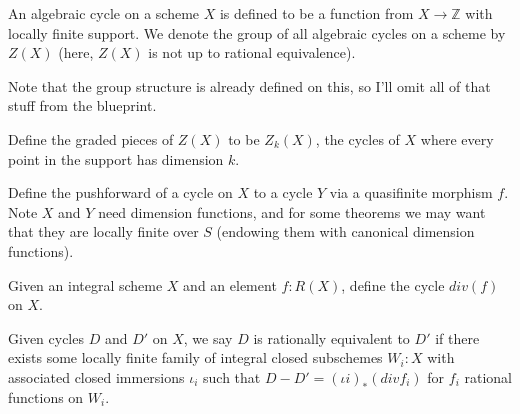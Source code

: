 \begin{definition}
  \label{def:algcycle}
  \leanok
  An algebraic cycle on a scheme $X$ is defined to be a function from
  $X \rightarrow \mathbb{Z}$ with locally finite support. We denote the group of all
  algebraic cycles on a scheme by $Z(X)$ (here, $Z(X)$ is not up to rational equivalence).

  Note that the group structure is already defined on this, so I'll omit all of that stuff
  from the blueprint.
\end{definition}

\begin{definition}
  \label{def:algcycleofdim}
  Define the graded pieces of $Z(X)$ to be $Z_k(X)$, the cycles of $X$ where every point
  in the support has dimension $k$.
\end{definition}

\begin{definition}
  \label{def:pushcycle}
  \leanok
  Define the pushforward of a cycle on $X$ to a cycle $Y$ via a quasifinite morphism $f$. 
  Note $X$ and $Y$ need dimension functions, and for some theorems we may want that they
  are locally finite over $S$ (endowing them with canonical dimension functions).

\end{definition}

\begin{theorem}
  \label{thm:pushfunc}
\end{theorem}

\begin{definition}
  \label{def:principaldivisor}


  Given an integral scheme $X$ and an element $f : R(X)$, 
  define the cycle $div(f)$ on $X$.
\end{definition}

\begin{definition}
  \label{def:rationalequivalence}
  Given cycles $D$ and $D'$ on $X$, we say $D$ is rationally equivalent to $D'$ if there
  exists some locally finite family of integral closed subschemes $W_i : X$ with associated
  closed immersions $\iota_i$ such that $D - D' = (\iota i)_* (div f_i)$ for $f_i$ rational
  functions on $W_i$.
\end{definition}

